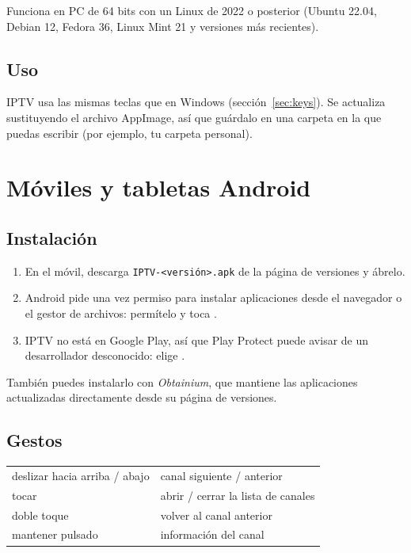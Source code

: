 Funciona en PC de 64 bits con un Linux de 2022 o posterior (Ubuntu 22.04,
Debian 12, Fedora 36, Linux Mint 21 y versiones más recientes).


\subsection{Uso}
IPTV usa las mismas teclas que en Windows (sección~\ref{sec:keys}). Se
actualiza sustituyendo el archivo AppImage, así que guárdalo en una carpeta en
la que puedas escribir (por ejemplo, tu carpeta personal).

\section{Móviles y tabletas Android}

\subsection{Instalación}
\begin{enumerate}
  \item En el móvil, descarga \texttt{IPTV-\textless versión\textgreater.apk}
        de la página de versiones y ábrelo.
  \item Android pide una vez permiso para instalar aplicaciones desde el
        navegador o el gestor de archivos: permítelo y toca .
  \item IPTV no está en Google Play, así que Play Protect puede avisar de un
        desarrollador desconocido: elige .
\end{enumerate}
También puedes instalarlo con \emph{Obtainium}, que mantiene las
aplicaciones actualizadas directamente desde su página de versiones.

\subsection{Gestos}
\begin{xltabular}{\linewidth}{@{}KX@{}}
deslizar hacia arriba / abajo & canal siguiente / anterior \\
tocar & abrir / cerrar la lista de canales \\
doble toque & volver al canal anterior \\
mantener pulsado & información del canal \\
\bottomrule
\end{xltabular}


